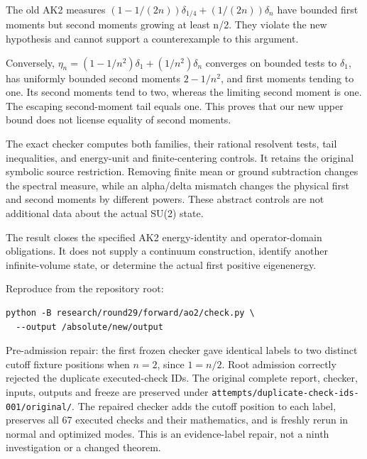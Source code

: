 The old AK2 measures \((1-1/(2n))\delta_{1/4}+(1/(2n))\delta_n\) have bounded first moments but second moments growing at least n/2. They violate the new hypothesis and cannot support a counterexample to this argument.

Conversely, \(\eta_n=(1-1/n^{2})\delta_1+(1/n^{2})\delta_n\) converges on bounded tests to \(\delta_1\), has uniformly bounded second moments \(2-1/n^{2}\), and first moments tending to one. Its second moments tend to two, whereas the limiting second moment is one. The escaping second-moment tail equals one. This proves that our new upper bound does not license equality of second moments.

The exact checker computes both families, their rational resolvent tests, tail inequalities, and energy-unit and finite-centering controls. It retains the original symbolic source restriction. Removing finite mean or ground subtraction changes the spectral measure, while an alpha/delta mismatch changes the physical first and second moments by different powers. These abstract controls are not additional data about the actual SU(2) state.

The result closes the specified AK2 energy-identity and operator-domain obligations. It does not supply a continuum construction, identify another infinite-volume state, or determine the actual first positive eigenenergy.

Reproduce from the repository root:
\begin{verbatim}
python -B research/round29/forward/ao2/check.py \
  --output /absolute/new/output
\end{verbatim}

Pre-admission repair: the first frozen checker gave identical labels to two distinct cutoff fixture positions when \(n=2\), since \(1=n/2\). Root admission correctly rejected the duplicate executed-check IDs. The original complete report, checker, inputs, outputs and freeze are preserved under \texttt{attempts/duplicate-check-ids-001/original/}. The repaired checker adds the cutoff position to each label, preserves all 67 executed checks and their mathematics, and is freshly rerun in normal and optimized modes. This is an evidence-label repair, not a ninth investigation or a changed theorem.

